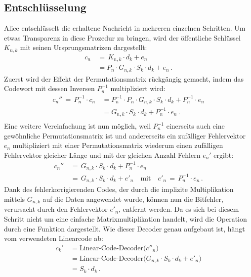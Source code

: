 \subsection{Entschlüsselung
\label{mceliece:section:entschl}}
Alice entschlüsselt die erhaltene Nachricht in mehreren einzelnen Schritten.
Um etwas Transparenz in diese Prozedur zu bringen, wird der öffentliche Schlüssel $K_{n,k}$ mit seinen Ursprungsmatrizen dargestellt:
\begin{align*}
    c_n\,&=\,K_{n,k}\cdot d_k + e_n \\
    &= P_{n}\cdot G_{n,k}\cdot S_{k}\cdot d_k + e_n\,.
\end{align*}
Zuerst wird der Effekt der Permutationsmatrix rückgängig gemacht,
indem das Codewort mit dessen Inversen $P_n^{-1}$ multipliziert wird:
\begin{align*}
    c_{n}''\,=\,P_n^{-1}\cdot c_n\,&= P_n^{-1}\cdot P_{n}\cdot G_{n,k}\cdot S_{k}\cdot d_k + P_n^{-1}\cdot e_n \\
                                         &= G_{n,k}\cdot S_{k}\cdot d_k + P_n^{-1}\cdot e_n\,. \\
\end{align*}
Eine weitere Vereinfachung ist nun möglich,
weil $P_n^{-1}$ einerseits auch eine gewöhnliche Permutationsmatrix ist
und andererseits ein zufälliger Fehlervektor $e_n$ multipliziert mit einer Permutationsmatrix
wiederum einen zufälligen Fehlervektor gleicher Länge und mit der gleichen Anzahl Fehlern $e_n'$ ergibt:
\begin{align*}
    c_{n}''\,&=\,G_{n,k}\cdot S_{k}\cdot d_k + P_n^{-1}\cdot e_n \\
             &=\,G_{n,k}\cdot S_{k}\cdot d_k + e'_n \quad \text{mit} \quad
    e'_n\,=\,P_n^{-1}\cdot e_n\,.
\end{align*}
Dank des fehlerkorrigierenden Codes, der durch die implizite Multiplikation mittels $G_{n,k}$ auf die Daten angewendet wurde,
können nun die Bitfehler, verursacht durch den Fehlervektor $e'_n$,
entfernt werden.
Da es sich bei diesem Schritt nicht um eine einfache Matrixmultiplikation handelt,
wird die Operation durch eine Funktion dargestellt.
Wie dieser Decoder genau aufgebaut ist,
hängt vom verwendeten Linearcode ab:
\begin{align*}
    c_{k}'\,&=\text{Linear-Code-Decoder($c''_n$)}\\
            &=\text{Linear-Code-Decoder($G_{n,k}\cdot S_{k}\cdot d_k + e'_n$)}\\
            &=S_{k}\cdot d_k\,.
\end{align*}
